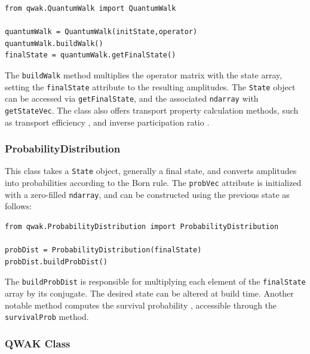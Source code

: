 \documentclass[../../dissertation.tex]{subfiles}
\begin{document}
\begin{lstlisting}[style=code,escapeinside={__}]
from qwak.QuantumWalk import QuantumWalk 

quantumWalk = QuantumWalk(initState,operator)
quantumWalk.buildWalk()
finalState = quantumWalk.getFinalState()
\end{lstlisting}

The \texttt{buildWalk} method multiplies the operator matrix with the state
array, setting the \texttt{finalState} attribute to the resulting amplitudes.
The \texttt{State} object can be accessed via \texttt{getFinalState}, and the
associated \texttt{ndarray} with \texttt{getStateVec}. The class also offers
transport property calculation methods, such as transport efficiency
\cite{razzoli21}, and inverse participation ratio \cite{buarqueAperiodic19}.

\subsubsection{ProbabilityDistribution}
This class takes a \texttt{State} object, generally a final state, and converts
amplitudes into probabilities according to the Born rule. The \texttt{probVec}
attribute is initialized with a zero-filled \texttt{ndarray}, and can be
constructed using the previous state as follows:

\begin{lstlisting}[style=code,escapeinside={__}]
from qwak.ProbabilityDistribution import ProbabilityDistribution

probDist = ProbabilityDistribution(finalState)
probDist.buildProbDist()
\end{lstlisting}

The \texttt{buildProbDist} is responsible for multiplying each element of the
\texttt{finalState} array by its conjugate. The desired state can be altered at
build time. Another notable method computes the survival probability
\cite{buarqueAperiodic19}, accessible through the \texttt{survivalProb} method.

\subsubsection{QWAK Class}
\end{document}
